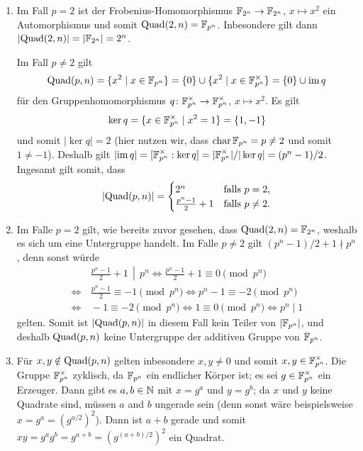 \begin{solution}
  \begin{enumerate}
    \item
      Im Fall $p = 2$ ist der Frobenius-Homomorphismus $\mathbb{F}_{2^n} \to \mathbb{F}_{2^n}$, $x \mapsto x^2$ ein Automorphismus und somit $\operatorname{Quad}(2,n) = \mathbb{F}_{p^n}$.
      Inbesondere gilt dann $|{\operatorname{Quad}(2,n)}| = |\mathbb{F}_{2^n}| = 2^n$.
      
      Im Fall $p \neq 2$ gilt
      \[
          \operatorname{Quad}(p,n)
        = \{ x^2 \mid x \in \mathbb{F}_{p^n} \}
        = \{0\} \cup \{x^2 \mid x \in \mathbb{F}_{p^n}^\times\}
        = \{0\} \cup \operatorname{im} q
      \]
      für den Gruppenhomomorphismus $q \colon \mathbb{F}_{p^n}^\times \to \mathbb{F}_{p^n}^\times$, $x \mapsto x^2$.
      Es gilt
      \[
          \ker q
        = \{x \in \mathbb{F}_{p^n}^\times \mid x^2 = 1\}
        = \{1,-1\}
      \]
      und somit $|{\ker q}| = 2$ (hier nutzen wir, dass $\operatorname{char} \mathbb{F}_{p^n} = p \neq 2$ und somit $1 \neq -1$).
      Deshalb gilt $|{\operatorname{im} q}| = [\mathbb{F}_{p^n}^\times : \ker q] = |\mathbb{F}_{p^n}^\times|/|\ker q| = (p^n - 1)/2$.
      Ingesamt gilt somit, dass
      \[
          |{\operatorname{Quad}(p,n)}| =
          \begin{cases}
            2^n                   & \text{falls $p = 2$},     \\
            \frac{p^n - 1}{2} + 1 & \text{falls $p \neq 2$}.
          \end{cases}
      \]
      
    \item
      Im Falle $p = 2$ gilt, wie bereits zuvor gesehen, dass $\operatorname{Quad}(2,n) = \mathbb{F}_{2^n}$, weshalb es sich um eine Untergruppe handelt.
      Im Falle $p \neq 2$ gilt $(p^n - 1)/2 + 1 \nmid p^n$, denn sonst würde
      \begin{align*}
            &\, \left. \frac{p^n - 1}{2} + 1 \,\middle|\, p^n \right.
        \iff    \frac{p^n - 1}{2} + 1 \equiv 0 \pmod{p^n}
        \\
        \iff&\, \frac{p^n - 1}{2} \equiv - 1 \pmod{p^n}
        \iff    p^n - 1 \equiv -2 \pmod{p^n}
        \\
        \iff&\, -1 \equiv -2 \pmod{p^n}
        \iff    1 \equiv 0  \pmod{p^n}
        \iff    p^n \mid 1
      \end{align*}
      gelten.
      Somit  ist $|{\operatorname{Quad}(p,n)}|$ in diesem Fall kein Teiler von $|\mathbb{F}_{p^n}|$, und deshalb $\operatorname{Quad}(p,n)$ keine Untergruppe der additiven Gruppe von $\mathbb{F}_{p^n}$.
      
    \item
      Für $x, y \notin \operatorname{Quad}(p,n)$ gelten inbesondere $x, y \neq 0$ und somit $x, y \in \mathbb{F}_{p^n}^\times$.
      Die Gruppe $\mathbb{F}_{p^n}^\times$ zyklisch, da $\mathbb{F}_{p^n}$ ein endlicher Körper ist;
      es sei $g \in \mathbb{F}_{p^n}^\times$ ein Erzeuger.
      Dann gibt es $a, b \in \mathbb{N}$ mit $x = g^a$ und $y = g^b$;
      da $x$ und $y$ keine Quadrate sind, müssen $a$ and $b$ ungerade sein (denn sonst wäre beispielsweise $x = g^a = (g^{a/2})^2$).
      Dann ist $a+b$ gerade und somit $xy = g^a g^b = g^{a+b} = (g^{(a+b)/2})^2$ ein Quadrat.
  \end{enumerate}
\end{solution}


